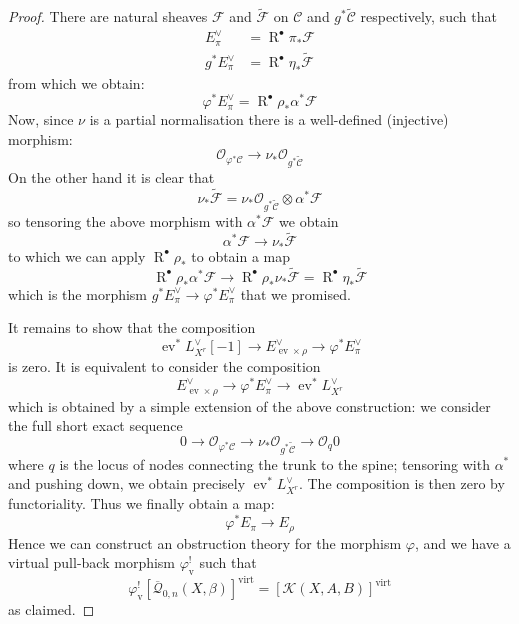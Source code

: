 \documentclass[11pt]{amsart}
\newcommand{\Q}[4]{\overline{\mathcal Q}_{#1,#2}(#3,#4)}
\newcommand{\OO}{\mathcal{O}}
\renewcommand{\to}{\rightarrow}
\newcommand{\virt}[1]{[#1]^{\operatorname{virt}}}
\newcommand{\R}{\operatorname{R}^{\bullet}}
\newcommand{\ev}{\operatorname{ev}}
\theoremstyle{plain}
\theoremstyle{definition}
\begin{document}
\begin{proof}
There are natural sheaves $\mathcal{F}$ and $\tilde{\mathcal{F}}$ on $\mathcal{C}$ and $g^* \tilde{\mathcal{C}}$ respectively, such that
\begin{align*} E_\pi^\vee & = \R \pi_* \mathcal{F} \\
g^* E_\pi^\vee & = \R \eta_* \tilde{\mathcal{F}} \end{align*}
from which we obtain:
\begin{equation*} \varphi^* E_\pi^\vee = \R \rho_* \alpha^* \mathcal{F} \end{equation*}
Now, since $\nu$ is a partial normalisation there is a well-defined (injective) morphism:
\begin{equation*} \OO_{\varphi^*{\mathcal{C}}} \to \nu_* \OO_{g^* \tilde{\mathcal{C}}} \end{equation*}
On the other hand it is clear that
\begin{equation*} \nu_* \tilde{\mathcal{F}} = \nu_* \OO_{g^* \tilde{\mathcal{C}}} \otimes \alpha^* \mathcal{F} \end{equation*}
so tensoring the above morphism with $\alpha^* \mathcal{F}$ we obtain
\begin{equation*} \alpha^* \mathcal{F} \to \nu_* \tilde{\mathcal{F}} \end{equation*}
to which we can apply $\R \rho_*$ to obtain a map
\begin{equation*} \R \rho_* \alpha^* \mathcal{F} \to \R \rho_* \nu_* \tilde{\mathcal{F}} = \R \eta_* \tilde{\mathcal{F}} \end{equation*}
which is the morphism $g^* E_\pi^\vee \to \varphi^* E_\pi^\vee$ that we promised.

It remains to show that the composition
\begin{equation*} \ev^*L_{X^r}^\vee [-1] \to E_{\ev \times \rho}^\vee \to \varphi^* E_\pi^\vee \end{equation*}
is zero. It is equivalent to consider the composition
\begin{equation*}  E_{\ev \times \rho}^\vee \to \varphi^* E_\pi^\vee \to \ev^*L_{X^r}^\vee \end{equation*}
which is obtained by a simple extension of the above construction: we consider the full short exact sequence
\begin{equation*} 0 \to \OO_{\varphi^* \mathcal{C}} \to \nu_* \OO_{g^* \tilde{\mathcal{C}}} \to \OO_q 0 \end{equation*}
where $q$ is the locus of nodes connecting the trunk to the spine; tensoring with $\alpha^*$ and pushing down, we obtain precisely $\ev^* L_{X^r}^\vee$. The composition is then zero by functoriality. Thus we finally obtain a map:
\begin{equation*} \varphi^* E_\pi \to E_\rho \end{equation*}
Hence we can construct an obstruction theory for the morphism $\varphi$, and we have a virtual pull-back morphism $\varphi^!_{\text{v}}$ such that
\begin{equation*} \varphi^!_{\text{v}} \virt{\Q{0}{n}{X}{\beta}} = \virt{\mathcal{K}(X,A,B)} \end{equation*}
as claimed. \end{proof}
\end{document}
